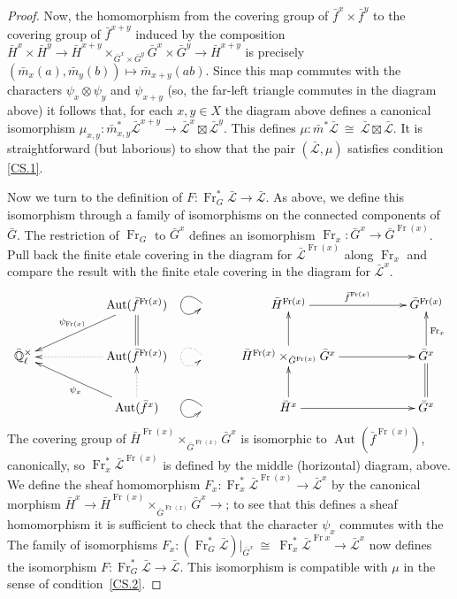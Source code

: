 \documentclass[11pt]{amsart}
\theoremstyle{plain}
\theoremstyle{definition}
\theoremstyle{remark}
\newcommand{\EE}{\mathbb{\bar Q}_\ell}
\newcommand{\Frob}{{\operatorname{Fr}}}
\DeclareMathOperator{\Aut}{Aut}
\newcommand{\iso}{{\ \cong\ }}
\newcommand{\gcs}[1]{{\mathcal{\bar #1}}}
\newcommand\Clifton[1]{\marginpar{\smaller\smaller CC: #1}}
\begin{document}
\begin{proof}
Now, the homomorphism from the covering group of ${\bar f}^x\times{\bar f}^y$ to the covering group of ${\bar f}^{x+y}$ induced by the composition $ {\bar H}^x\times {\bar H}^y \to {\bar H}^{x+y} \times_{{\bar G}^x\times{\bar G}^y} {\bar G}^x\times{\bar G}^y \to {\bar H}^{x+y}$ is precisely $({\bar m}_x(a),{\bar m}_y(b)) \mapsto {\bar m}_{x+y}(ab)$. Since this map commutes with the characters $\psi_x\otimes\psi_y$ and $\psi_{x+y}$ (so, the far-left triangle commutes in the diagram above) it follows that, for each $x,y\in X$ the diagram above defines a canonical isomorphism
$\mu_{x,y} : {\bar m}_{x,y}^* \gcs{L}^{x+y} \to \gcs{L}^x \boxtimes\gcs{L}^y$.
This defines $\mu: {\bar m}^* \gcs{L} \iso \gcs{L} \boxtimes\gcs{L}$. It is straightforward (but laborious) to show that the pair $(\gcs{L},\mu)$ satisfies condition \ref{CS.1}.

Now we turn to the definition of $F : \Frob_{G}^* \gcs{L} \to \gcs{L}$. As above, we define this isomorphism through a family of isomorphisms on the connected components of ${\bar G}$. The restriction of $\Frob_{G}$ to ${\bar G}^x$ defines an isomorphism $\Frob_x : {\bar G}^x \to {\bar G}^{\Frob(x)}$. 
Pull back the finite etale covering in the diagram for $\gcs{L}^{\Frob(x)}$ along $\Frob_x$ and compare the result with the finite etale covering in the diagram for $\gcs{L}^{x}$.
\[
\xymatrix{ 
  && \ar[dll]_{\psi_{\Frob(x)}} \Aut({\bar f}^{\Frob(x)}) & \ar@(ul,dl) & {\bar H}^{\Frob(x)} \ar[rr]^{{\bar f}^{\Frob(x)}} && {\bar G}^{\Frob(x)}\\ 
\EE^\times & & \ar@{.>}[ll] \Aut({\bar f}^{\Frob(x)})  \ar@{=}[u] & \ar@{.>}@(ul,dl)  & \ar[u] {\bar H}^{\Frob(x)} \times_{{\bar G}^{\Frob(x)}} {\bar G}^x \ar[rr] && \ar[u]_{\Frob_{x}} {\bar G}^x\\
& &  \ar[ull]^{\psi_x}  \ar@{.>}[u] \Aut({\bar f}^{x}) & \ar@(ul,dl) & \ar[u] {\bar H}^x \ar[rr] && \ar@{=} [u] {\bar G}^x\\
}
\] 
The covering group of ${\bar H}^{\Frob(x)} \times_{{\bar G}^{\Frob(x)}} {\bar G}^x$ is isomorphic to $\Aut({\bar f}^{\Frob(x)})$, canonically, so $\Frob_x^* \gcs{L}^{\Frob(x)}$ is defined by the middle (horizontal) diagram, above.  We define the sheaf homomorphism $F_x : \Frob_x^* \gcs{L}^{\Frob(x)} \to \gcs{L}^x$ by the canonical morphism ${\bar H}^x \to  {\bar H}^{\Frob(x)} \times_{{\bar G}^{\Frob(x)}} {\bar G}^x \to $; to see that this defines a sheaf homomorphism it is sufficient to check that the character $\psi_x$ commutes with the  
The family of isomorphisms  $F_x : (\Frob_{G}^* \gcs{L})\vert_{{\bar G}^x} \iso \Frob_x^* \gcs{L}^{\Frob{x}} \to \gcs{L}^x$ now defines the isomorphism $F : \Frob_{G}^* \gcs{L} \to \gcs{L}$. 
\Clifton{Add some detail here.}
This isomorphism is compatible with $\mu$ in the sense of condition~\ref{CS.2}. 
\end{proof}
\end{document}
